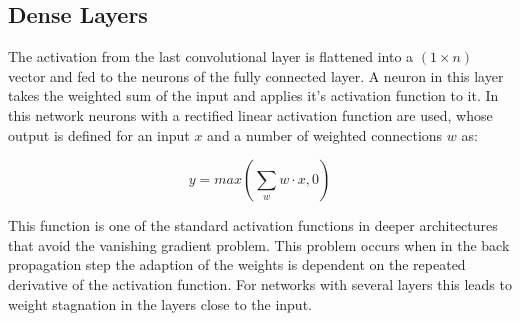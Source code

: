 \documentclass[main.tex]{subfiles}
\begin{document}
\subsection{Dense Layers}
The activation from the last convolutional layer is flattened into a $(1 \times n)$ vector and fed to the neurons of the fully connected layer. A neuron in this layer takes the weighted sum of the input and applies it's activation function to it. In this network neurons with a rectified linear activation function are used, whose output is defined for an input $x$ and a number of weighted connections $w$ as:

\begin{equation}
\label{eq:dense}
y=max(\sum_w w \cdot x,0)
\end{equation}

This function is one of the standard activation functions in deeper architectures that avoid the vanishing gradient problem. This problem occurs when in the back propagation step the adaption of the weights is dependent on the repeated derivative of the activation function. For networks with several layers this leads to weight stagnation in the layers close to the input.
\end{document}
